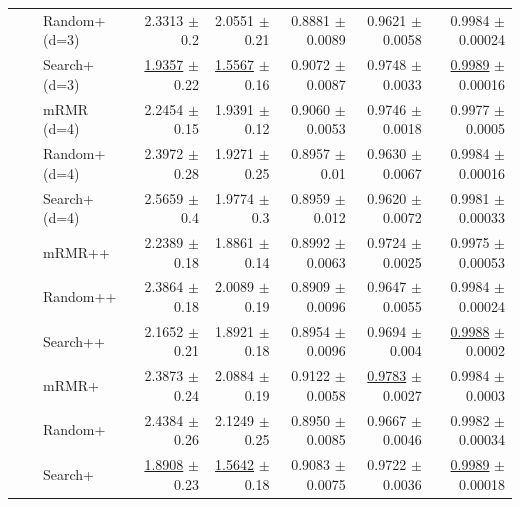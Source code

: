 \begin{longtable}{llp{}rrrrr}
 &  & Random+ (d=3) & 2.3313 {\scriptsize $\pm$ 0.2} & 2.0551 {\scriptsize $\pm$ 0.21} & 0.8881 {\scriptsize $\pm$ 0.0089} & 0.9621 {\scriptsize $\pm$ 0.0058} & 0.9984 {\scriptsize $\pm$ 0.00024} \\
 &  & Search+ (d=3) & \underline{1.9357} {\scriptsize $\pm$ 0.22} & \underline{1.5567} {\scriptsize $\pm$ 0.16} & 0.9072 {\scriptsize $\pm$ 0.0087} & 0.9748 {\scriptsize $\pm$ 0.0033} & \underline{0.9989} {\scriptsize $\pm$ 0.00016} \\
 &  & mRMR (d=4) & 2.2454 {\scriptsize $\pm$ 0.15} & 1.9391 {\scriptsize $\pm$ 0.12} & 0.9060 {\scriptsize $\pm$ 0.0053} & 0.9746 {\scriptsize $\pm$ 0.0018} & 0.9977 {\scriptsize $\pm$ 0.0005} \\
 &  & Random+ (d=4) & 2.3972 {\scriptsize $\pm$ 0.28} & 1.9271 {\scriptsize $\pm$ 0.25} & 0.8957 {\scriptsize $\pm$ 0.01} & 0.9630 {\scriptsize $\pm$ 0.0067} & 0.9984 {\scriptsize $\pm$ 0.00016} \\
 &  & Search+ (d=4) & 2.5659 {\scriptsize $\pm$ 0.4} & 1.9774 {\scriptsize $\pm$ 0.3} & 0.8959 {\scriptsize $\pm$ 0.012} & 0.9620 {\scriptsize $\pm$ 0.0072} & 0.9981 {\scriptsize $\pm$ 0.00033} \\
 &  & mRMR++ & 2.2389 {\scriptsize $\pm$ 0.18} & 1.8861 {\scriptsize $\pm$ 0.14} & 0.8992 {\scriptsize $\pm$ 0.0063} & 0.9724 {\scriptsize $\pm$ 0.0025} & 0.9975 {\scriptsize $\pm$ 0.00053} \\
 &  & Random++ & 2.3864 {\scriptsize $\pm$ 0.18} & 2.0089 {\scriptsize $\pm$ 0.19} & 0.8909 {\scriptsize $\pm$ 0.0096} & 0.9647 {\scriptsize $\pm$ 0.0055} & 0.9984 {\scriptsize $\pm$ 0.00024} \\
 &  & Search++ & 2.1652 {\scriptsize $\pm$ 0.21} & 1.8921 {\scriptsize $\pm$ 0.18} & 0.8954 {\scriptsize $\pm$ 0.0096} & 0.9694 {\scriptsize $\pm$ 0.004} & \underline{0.9988} {\scriptsize $\pm$ 0.0002} \\
 &  & mRMR+ & 2.3873 {\scriptsize $\pm$ 0.24} & 2.0884 {\scriptsize $\pm$ 0.19} & 0.9122 {\scriptsize $\pm$ 0.0058} & \underline{0.9783} {\scriptsize $\pm$ 0.0027} & 0.9984 {\scriptsize $\pm$ 0.0003} \\
 &  & Random+ & 2.4384 {\scriptsize $\pm$ 0.26} & 2.1249 {\scriptsize $\pm$ 0.25} & 0.8950 {\scriptsize $\pm$ 0.0085} & 0.9667 {\scriptsize $\pm$ 0.0046} & 0.9982 {\scriptsize $\pm$ 0.00034} \\
 &  & Search+ & \underline{1.8908} {\scriptsize $\pm$ 0.23} & \underline{1.5642} {\scriptsize $\pm$ 0.18} & 0.9083 {\scriptsize $\pm$ 0.0075} & 0.9722 {\scriptsize $\pm$ 0.0036} & \underline{0.9989} {\scriptsize $\pm$ 0.00018} \\

\end{longtable}
